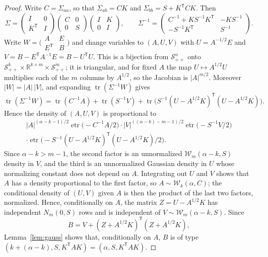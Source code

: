 \documentclass{amsart}
\theoremstyle{definition}
\theoremstyle{remark}
\numberwithin{equation}{section}
\newcommand{\R}{\mathbb{R}}
\newcommand{\E}{\mathsf{E}}
\newcommand{\Sym}{\mathcal{S}}
\newcommand{\W}{\mathcal{W}}
\newcommand{\tr}{\operatorname{tr}}
\newcommand{\etr}{\operatorname{etr}}
\begin{document}
\begin{proof}
Write $C=\Sigma_{aa}$, so that $\Sigma_{ab}=CK$ and $\Sigma_{bb}=S+K^{\mathsf T}CK$. Then
\[
\Sigma=\begin{pmatrix}I&0\\ K^{\mathsf T}&I\end{pmatrix}\begin{pmatrix}C&0\\0&S\end{pmatrix}\begin{pmatrix}I&K\\0&I\end{pmatrix},\qquad
\Sigma^{-1}=\begin{pmatrix}C^{-1}+KS^{-1}K^{\mathsf T}&-KS^{-1}\\ -S^{-1}K^{\mathsf T}&S^{-1}\end{pmatrix}.
\]
Write $W=\bigl(\begin{smallmatrix}A&E\\E^{\mathsf T}&B\end{smallmatrix}\bigr)$ and change variables to $(A,U,V)$ with $U=A^{-1/2}E$ and $V=B-E^{\mathsf T}A^{-1}E=B-U^{\mathsf T}U$. This is a bijection from $\Sym^n_{++}$ onto $\Sym^k_{++}\times\R^{k\times m}\times\Sym^m_{++}$; it is triangular, and for fixed $A$ the map $U\mapsto A^{1/2}U$ multiplies each of the $m$ columns by $A^{1/2}$, so the Jacobian is $|A|^{m/2}$. Moreover $|W|=|A|\,|V|$, and expanding $\tr(\Sigma^{-1}W)$ gives
\[
\tr(\Sigma^{-1}W)=\tr(C^{-1}A)+\tr(S^{-1}V)+\tr\bigl(S^{-1}(U-A^{1/2}K)^{\mathsf T}(U-A^{1/2}K)\bigr).
\]
Hence the density of $(A,U,V)$ is proportional to
\begin{multline*}
|A|^{(\alpha-k-1)/2}\etr\bigl(-C^{-1}A/2\bigr)\cdot|V|^{((\alpha-k)-m-1)/2}\etr\bigl(-S^{-1}V/2\bigr)\\
\cdot\etr\bigl(-S^{-1}(U-A^{1/2}K)^{\mathsf T}(U-A^{1/2}K)/2\bigr).
\end{multline*}
Since $\alpha-k>m-1$, the second factor is an unnormalized $\W_m(\alpha-k,S)$ density in $V$, and the third is an unnormalized Gaussian density in $U$ whose normalizing constant does not depend on $A$. Integrating out $U$ and $V$ shows that $A$ has a density proportional to the first factor, so $A\sim\W_k(\alpha,C)$; the conditional density of $(U,V)$ given $A$ is then the product of the last two factors, normalized. Hence, conditionally on $A$, the matrix $Z=U-A^{1/2}K$ has independent $N_m(0,S)$ rows and is independent of $V\sim\W_m(\alpha-k,S)$. Since
\[
B=V+(Z+A^{1/2}K)^{\mathsf T}(Z+A^{1/2}K),
\]
Lemma~\ref{lem:gauss} shows that, conditionally on $A$, $B$ is of type $(k+(\alpha-k),S,K^{\mathsf T}AK)=(\alpha,S,K^{\mathsf T}AK)$.
\end{proof}
\end{document}
